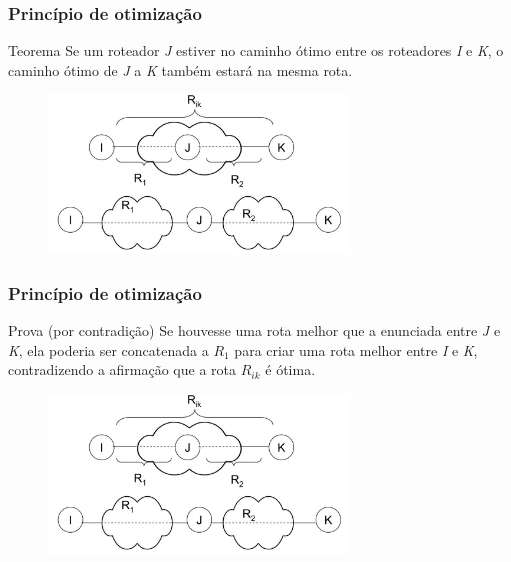 \documentclass{beamer}
\begin{document}
\begin{frame}
\frametitle{Princípio de otimização}
\begin{block}{Teorema}
Se um roteador \emph{J} estiver no caminho ótimo entre os roteadores \emph{I} e \emph{K}, o caminho
ótimo de \emph{J} a \emph{K} também estará na mesma rota.
\end{block}
\begin{figure}[htp]
\begin{center}
  \includegraphics[width=80mm]{Imagens/PrincipioOtimizacao.jpeg}
  \label{principio_otimizacao}
\end{center}
\end{figure}
\end{frame}

\begin{frame}
\frametitle{Princípio de otimização}
\begin{block}{Prova (por contradição)}
Se houvesse uma rota melhor que a enunciada entre \emph{J} e \emph{K}, ela poderia ser
concatenada a $R_1$ para criar uma rota melhor entre \emph{I} e \emph{K}, contradizendo a
afirmação que a rota $R_{ik}$ é ótima.
\end{block}
\begin{figure}[htp]
\begin{center}
  \includegraphics[width=80mm]{Imagens/PrincipioOtimizacao.jpeg}
  \label{principio_otimizacao2}
\end{center}
\end{figure}
\end{frame}
\end{document}
